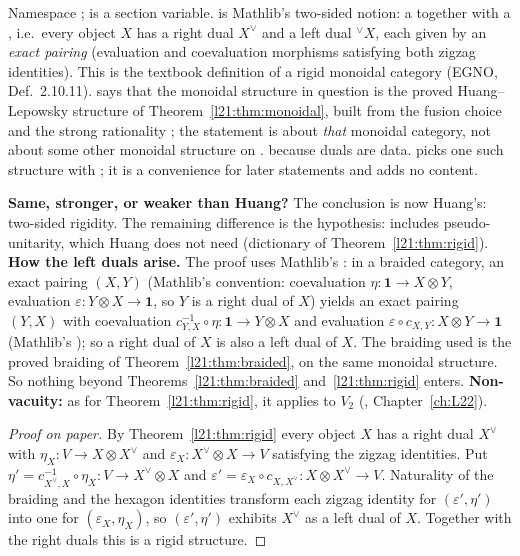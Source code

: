 \begin{dictionary}
Namespace ;  is a section variable.  is
Mathlib's two-sided notion: a  together with a , i.e.\ every object $X$ has a
right dual $X^\vee$ and a left dual ${}^\vee X$, each given by an \emph{exact pairing} (evaluation and coevaluation morphisms
satisfying both zigzag identities). This is the textbook definition of a rigid monoidal category (EGNO, Def.~2.10.11).
 says that the monoidal structure in question is the proved
Huang--Lepowsky structure of Theorem~\ref{l21:thm:monoidal}, built from the fusion choice  and the strong rationality
; the statement is about \emph{that} monoidal category, not about some other monoidal structure on
.  because duals are data.  picks one such structure with
; it is a convenience for later statements and adds no content.

\textbf{Same, stronger, or weaker than Huang?} The conclusion is now Huang's: two-sided rigidity. The remaining difference is
the hypothesis:  includes pseudo-unitarity, which Huang does not need (dictionary of
Theorem~\ref{l21:thm:rigid}). \textbf{How the left duals arise.} The proof uses Mathlib's
: in a braided category, an exact pairing $(X,Y)$ (Mathlib's
convention: coevaluation $\eta\colon\mathbf 1\to X\otimes Y$, evaluation $\varepsilon\colon Y\otimes X\to\mathbf 1$, so $Y$ is a
right dual of $X$) yields an exact pairing $(Y,X)$ with coevaluation $c_{Y,X}^{-1}\circ\eta\colon\mathbf 1\to Y\otimes X$ and
evaluation $\varepsilon\circ c_{X,Y}\colon X\otimes Y\to\mathbf 1$ (Mathlib's ); so a right dual of $X$
is also a left dual of $X$. The braiding used is the proved braiding
 of Theorem~\ref{l21:thm:braided}, on the same monoidal structure. So
nothing beyond Theorems~\ref{l21:thm:braided} and~\ref{l21:thm:rigid} enters. \textbf{Non-vacuity:} as for
Theorem~\ref{l21:thm:rigid}, it applies to $V_2$ (, Chapter~\ref{ch:L22}).
\end{dictionary}

\begin{proof}[Proof on paper]
By Theorem~\ref{l21:thm:rigid} every object $X$ has a right dual $X^\vee$ with $\eta_X\colon V\to X\otimes X^\vee$
and $\varepsilon_X\colon X^\vee\otimes X\to V$ satisfying the zigzag identities. Put $\eta'=c_{X^\vee,X}^{-1}\circ\eta_X\colon
V\to X^\vee\otimes X$ and $\varepsilon'=\varepsilon_X\circ c_{X,X^\vee}\colon X\otimes X^\vee\to V$. Naturality of the braiding and the
hexagon identities transform each zigzag identity for $(\varepsilon',\eta')$ into one for $(\varepsilon_X,\eta_X)$, so
$(\varepsilon',\eta')$ exhibits $X^\vee$ as a left dual of $X$. Together with the right duals this is a rigid structure.
\end{proof}

